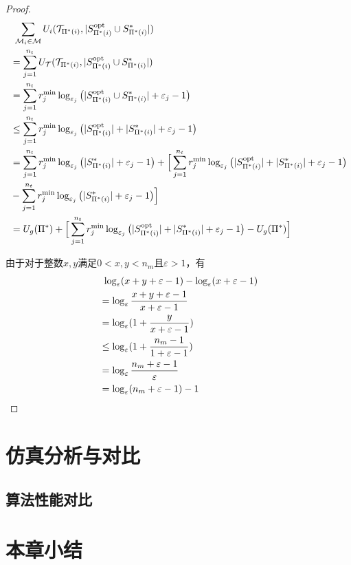\begin{proposition}
\begin{proof}
		\begin{align}
			&\ \sum_{\mathcal{M}_i \in \mathcal{M}} U_i(\mathcal{T}_{\Pi^*(i)}, |S_{\Pi^*(i)}^{\text{opt}} \cup S_{\Pi^*(i)}^*|)\notag\\
			&= \sum_{j=1}^{n_t} U_{\mathcal{T}}(\mathcal{T}_{\Pi^*(i)},|S_{\Pi^*(i)}^{\text{opt}} \cup S_{\Pi^*(i)}^*|)\notag\\
			&= \sum_{j=1}^{n_t} r_j^{\text{min}} \log_{\varepsilon_j} \big(|S_{\Pi^*(i)}^{\text{opt}} \cup S_{\Pi^*(i)}^*| + \varepsilon_j - 1\big)\notag\\
			&\leq \sum_{j=1}^{n_t} r_j^{\text{min}} \log_{\varepsilon_j} \big(|S_{\Pi^*(i)}^{\text{opt}}| + |S_{\Pi^*(i)}^*| + \varepsilon_j - 1\big)\notag\\
			&= \sum_{j=1}^{n_t} r_j^{\text{min}} \log_{\varepsilon_j}\big(|S_{\Pi^*(i)}^*|+ \varepsilon_j - 1\big) + \Big[\sum_{j=1}^{n_t} r_j^{\text{min}} \log_{\varepsilon_j} \big(|S_{\Pi^*(i)}^{\text{opt}}| + |S_{\Pi^*(i)}^*| + \varepsilon_j - 1\big)\notag\\
			&- \sum_{j=1}^{n_t} r_j^{\text{min}} \log_{\varepsilon_j}\big(|S_{\Pi^*(i)}^*|+ \varepsilon_j - 1\big)\Big]\notag\\
			&= U_g(\Pi^*) + \Big[\sum_{j=1}^{n_t} r_j^{\text{min}} \log_{\varepsilon_j} \big(|S_{\Pi^*(i)}^{\text{opt}}| + |S_{\Pi^*(i)}^*| + \varepsilon_j - 1\big) - U_g(\Pi^*) \Big]
		\end{align}
		
		由于对于整数$x,y$满足$0< x,y < n_m$且$\varepsilon>1$，有
		\begin{align}
			&\ \log_{\varepsilon}(x+y+\varepsilon-1) - \log_{\varepsilon}(x+\varepsilon-1)\notag\\
			&= \log_{\varepsilon} \frac{x+y+\varepsilon-1}{x+\varepsilon-1}\notag\\
			&= \log_{\varepsilon}(1+\frac{y}{x+\varepsilon-1})\notag\\
			&\leq \log_{\varepsilon}(1+\frac{n_m-1}{1+\varepsilon-1})\notag\\
			&= \log_{\varepsilon}\frac{n_m+\varepsilon-1}{\varepsilon}\notag\\
			&= \log_{\varepsilon}(n_m+\varepsilon-1)-1
		\end{align}
		
	\end{proof}
\end{proposition}


\section{仿真分析与对比}
\label{hg:sec:simulation}

\subsection{算法性能对比}
\label{simu:sub:conpare}

\section{本章小结}
\label{hg:sec:conclusion}




